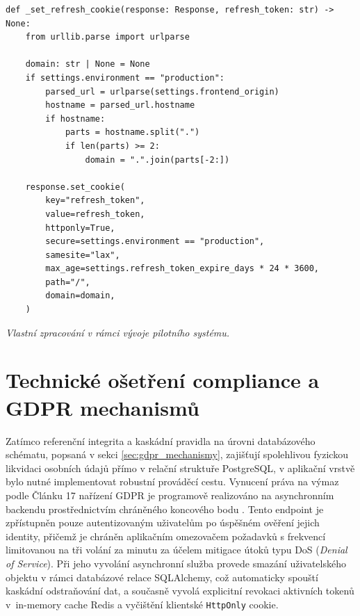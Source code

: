 \documentclass[male,czech,api_bc]{kitheses}
\newcommand{\zdroj}[1]{%
    \vspace{1ex}%
    {\footnotesize \raggedright \textit{#1}\par}%
}
\begin{document}
\begin{listing}[htbp]
\begin{verbatim}
def _set_refresh_cookie(response: Response, refresh_token: str) -> None:
    from urllib.parse import urlparse

    domain: str | None = None
    if settings.environment == "production":
        parsed_url = urlparse(settings.frontend_origin)
        hostname = parsed_url.hostname
        if hostname:
            parts = hostname.split(".")
            if len(parts) >= 2:
                domain = ".".join(parts[-2:])

    response.set_cookie(
        key="refresh_token",
        value=refresh_token,
        httponly=True,
        secure=settings.environment == "production",
        samesite="lax",
        max_age=settings.refresh_token_expire_days * 24 * 3600,
        path="/",
        domain=domain,
    )
\end{verbatim}
\caption{Konfigurace a zápis HttpOnly cookie s dynamickou doménovou fixací}
\label{lst:set_cookie}
\zdroj{Vlastní zpracování v rámci vývoje pilotního systému.}
\end{listing}

\section{Technické ošetření compliance a GDPR mechanismů}
\label{sec:gdpr_compliance}

Zatímco referenční integrita a kaskádní pravidla na úrovni databázového schématu, popsaná v sekci \vref{sec:gdpr_mechanismy}, zajišťují spolehlivou fyzickou likvidaci osobních údajů přímo v relační struktuře PostgreSQL, v aplikační vrstvě bylo nutné implementovat robustní prováděcí cestu. Vynucení práva na výmaz podle Článku 17 nařízení GDPR \cite{GDPR2016} je programově realizováno na asynchronním backendu prostřednictvím chráněného koncového bodu . Tento endpoint je zpřístupněn pouze autentizovaným uživatelům po úspěšném ověření jejich identity, přičemž je chráněn aplikačním omezovačem požadavků s frekvencí limitovanou na tři volání za minutu za účelem mitigace útoků typu DoS (\textit{Denial of Service}). Při jeho vyvolání asynchronní služba provede smazání uživatelského objektu v rámci databázové relace SQLAlchemy, což automaticky spouští kaskádní odstraňování dat, a současně vyvolá explicitní revokaci aktivních tokenů v~in-memory cache Redis a vyčištění klientské \texttt{HttpOnly} cookie.
\end{document}
